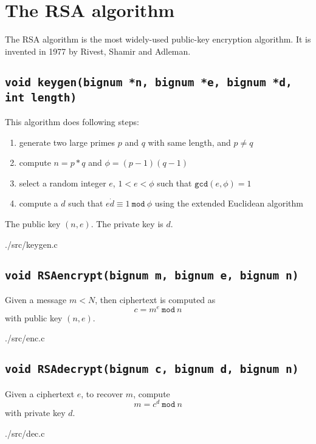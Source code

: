 \section{The RSA algorithm}
The RSA algorithm is the most widely-used public-key encryption algorithm.
It is invented in 1977 by Rivest, Shamir and Adleman.

\subsection{\texttt{void keygen(bignum *n, bignum *e, bignum *d, int length)}}
This algorithm does following steps:
\begin{enumerate}
  \item generate two large primes $p$ and $q$ with same length, and $p \neq q$
  \item compute $n = p*q$ and $\phi = (p-1)(q-1)$ 
  \item select a random integer $e$, $1 < e < \phi$ such that $\texttt{gcd}(e,
    \phi) = 1$
  \item compute a $d$ such that $e \dot d \equiv 1\ \texttt{mod}\ \phi$ using
    the extended Euclidean algorithm
\end{enumerate}
The public key $(n, e)$. The private key is $d$.

{./src/keygen.c}

\subsection{\texttt{void RSAencrypt(bignum m, bignum e, bignum n)}}
Given a message $m < N$, then ciphertext is computed as
$$c = m^e\ \texttt{mod}\ n$$ with public key $(n, e)$.

{./src/enc.c}

\subsection{\texttt{void RSAdecrypt(bignum c, bignum d, bignum n)}}
Given a ciphertext $e$, to recover $m$, compute
$$m = c^d \ \texttt{mod}\ n$$ with private key $d$.

{./src/dec.c}

